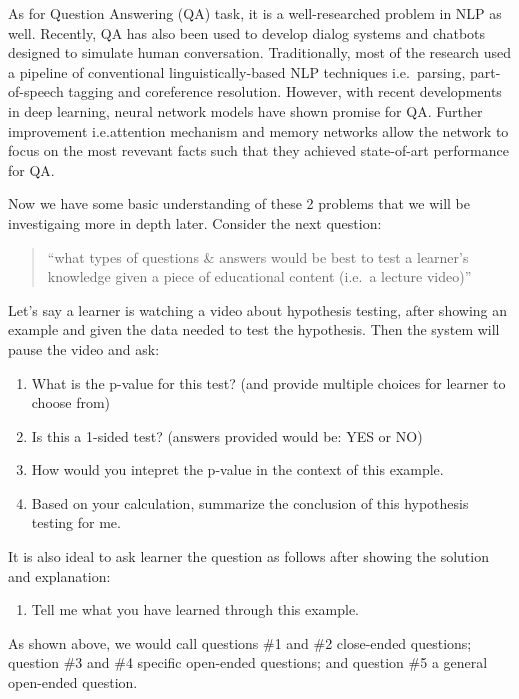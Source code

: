 \documentclass[]{book}
\providecommand{\tightlist}{%
  \setlength{\itemsep}{0pt}\setlength{\parskip}{0pt}}
\theoremstyle{definition}
\theoremstyle{definition}
\theoremstyle{definition}
\theoremstyle{remark}
\begin{document}
As for Question Answering (QA) task, it is a well-researched problem in
NLP as well. Recently, QA has also been used to develop dialog systems
and chatbots designed to simulate human conversation. Traditionally,
most of the research used a pipeline of conventional
linguistically-based NLP techniques i.e.~parsing, part-of-speech tagging
and coreference resolution. However, with recent developments in deep
learning, neural network models have shown promise for QA. Further
improvement i.e.attention mechanism and memory networks allow the
network to focus on the most revevant facts such that they achieved
state-of-art performance for QA.

Now we have some basic understanding of these 2 problems that we will be
investigaing more in depth later. Consider the next question:

\begin{quote}
``what types of questions \& answers would be best to test a learner's
knowledge given a piece of educational content (i.e.~a lecture video)''
\end{quote}

Let's say a learner is watching a video about hypothesis testing, after
showing an example and given the data needed to test the hypothesis.
Then the system will pause the video and ask:

\begin{enumerate}
\def\labelenumi{\arabic{enumi}.}
\item
  What is the p-value for this test? (and provide multiple choices for
  learner to choose from)
\item
  Is this a 1-sided test? (answers provided would be: YES or NO)
\item
  How would you intepret the p-value in the context of this example.
\item
  Based on your calculation, summarize the conclusion of this hypothesis
  testing for me.
\end{enumerate}

It is also ideal to ask learner the question as follows after showing
the solution and explanation:

\begin{enumerate}
\def\labelenumi{\arabic{enumi}.}
\setcounter{enumi}{4}
\tightlist
\item
  Tell me what you have learned through this example.
\end{enumerate}

As shown above, we would call questions \#1 and \#2 close-ended
questions; question \#3 and \#4 specific open-ended questions; and
question \#5 a general open-ended question.
\end{document}

